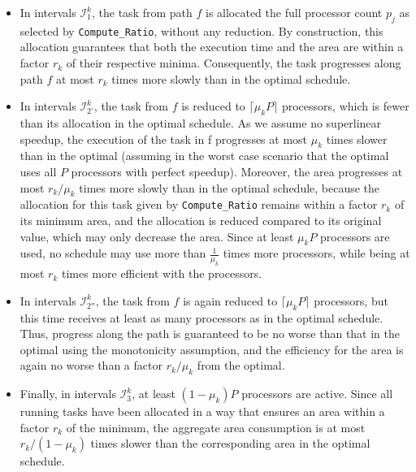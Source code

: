\documentclass{article}
\newcommand\rratio{r\xspace}
\begin{document}
\begin{itemize}
    \item In intervals \( \mathcal{I}_1^k \), the task from path \( f \) is allocated the full processor count \( p_j \) as selected by \texttt{Compute\_Ratio}, without any reduction. By construction, this allocation guarantees that both the execution time and the area are within a factor \( \rratio_k \) of their respective minima. Consequently, the task progresses along path \( f \) at most \( \rratio_k \) times more slowly than in the optimal schedule.
    
    \item In intervals \( \mathcal{I}_{2'}^k \), the task from \( f \) is reduced to \( \lceil \mu_k P \rceil \) processors, which is fewer than its allocation in the optimal schedule. As we assume no superlinear speedup, the execution of the task in f progresses at most \( \mu_k \) times slower than in the optimal (assuming in the worst case scenario that the optimal uses all $P$ processors with perfect speedup). Moreover, the area progresses at most \( \rratio_k / \mu_k \) times more slowly than in the optimal schedule, because the allocation for this task given by \texttt{Compute\_Ratio} remains within a factor \( \rratio_k \) of its minimum area, and the allocation is reduced compared to its original value, which may only decrease the area. Since at least $\mu_k P$ processors are used, no schedule may use more than $\frac{1}{\mu_k}$ times more processors, while being at most $\rratio_k$ times more efficient with the processors.
    
    \item In intervals \( \mathcal{I}_{2''}^k \), the task from \( f \) is again reduced to \( \lceil \mu_k P \rceil \) processors, but this time receives at least as many processors as in the optimal schedule. Thus, progress along the path is guaranteed to be no worse than that in the optimal using the monotonicity assumption, and the efficiency for the area is again no worse than a factor \( \rratio_k / \mu_k \) from the optimal.
    
    \item Finally, in intervals \( \mathcal{I}_3^k \), at least \( (1 - \mu_k)P \) processors are active. Since all running tasks have been allocated in a way that ensures an area within a factor \( \rratio_k \) of the minimum, the aggregate area consumption is at most \( \rratio_k / (1 - \mu_k) \) times slower than the corresponding area in the optimal schedule.
    
\end{itemize}
\end{document}
